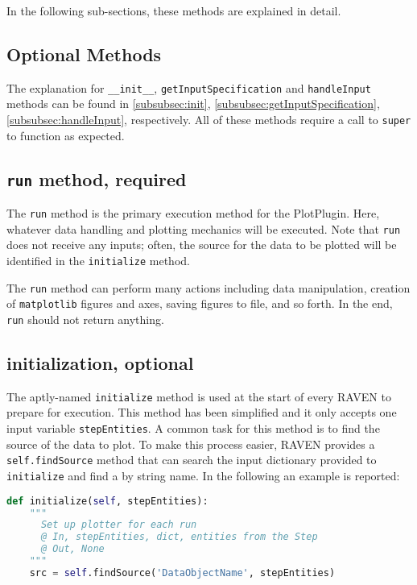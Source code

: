 In the following sub-sections, these methods are explained in detail.

\subsection{Optional Methods}
The explanation for \texttt{\_\_init\_\_}, \texttt{getInputSpecification} and \texttt{handleInput}
methods can be found in \ref{subsubsec:init}, \ref{subsubsec:getInputSpecification},
\ref{subsubsec:handleInput}, respectively. All of these methods require a call to \texttt{super} to
function as expected.
%
%
\subsection{\texttt{run} method, required}
The \texttt{run} method is the primary execution method for the PlotPlugin. Here, whatever data
handling and plotting mechanics will be executed. Note that \texttt{run} does not receive any inputs;
often, the source for the data to be plotted will be identified in the \texttt{initialize} method.

The \texttt{run} method can perform many actions including data manipulation, creation of
\texttt{matplotlib} figures and axes, saving figures to file, and so forth. In the end, \texttt{run}
should not return anything.
%
%
\subsection{initialization, optional}
The aptly-named \texttt{initialize} method is used at the start of every RAVEN  to prepare
for execution. This method has been simplified and it only accepts one input variable \texttt{stepEntities}.
A common task for this method is to find the source of the data to plot. To make this
process easier, RAVEN provides a \texttt{self.findSource} method that can search the input dictionary
provided to \texttt{initialize} and find a  by string name. In the following
an example is reported:

\begin{lstlisting}[language=python]
  def initialize(self, stepEntities):
    """
      Set up plotter for each run
      @ In, stepEntities, dict, entities from the Step
      @ Out, None
    """
    src = self.findSource('DataObjectName', stepEntities)
\end{lstlisting}
%
%
